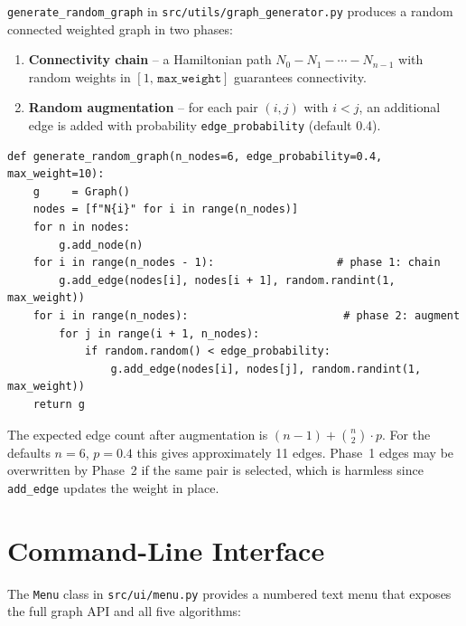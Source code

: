 \documentclass[12pt, a4paper]{article}
\begin{document}
\texttt{generate\_random\_graph} in \texttt{src/utils/graph\_generator.py}
produces a random connected weighted graph in two phases:

\begin{enumerate}
    \item \textbf{Connectivity chain} -- a Hamiltonian path
          $N_0 - N_1 - \cdots - N_{n-1}$ with random weights in
          $[1,\,\texttt{max\_weight}]$ guarantees connectivity.
    \item \textbf{Random augmentation} -- for each pair $(i,j)$ with
          $i < j$, an additional edge is added with probability
          \texttt{edge\_probability} (default 0.4).
\end{enumerate}

\begin{lstlisting}[caption={Random graph generator (\texttt{src/utils/graph\_generator.py}).}]
def generate_random_graph(n_nodes=6, edge_probability=0.4, max_weight=10):
    g     = Graph()
    nodes = [f"N{i}" for i in range(n_nodes)]
    for n in nodes:
        g.add_node(n)
    for i in range(n_nodes - 1):                   # phase 1: chain
        g.add_edge(nodes[i], nodes[i + 1], random.randint(1, max_weight))
    for i in range(n_nodes):                        # phase 2: augment
        for j in range(i + 1, n_nodes):
            if random.random() < edge_probability:
                g.add_edge(nodes[i], nodes[j], random.randint(1, max_weight))
    return g
\end{lstlisting}

The expected edge count after augmentation is
$(n-1) + \binom{n}{2}\cdot p$. For the defaults $n=6$, $p=0.4$ this
gives approximately 11 edges. Phase~1 edges may be overwritten by
Phase~2 if the same pair is selected, which is harmless since
\texttt{add\_edge} updates the weight in place.

\section{Command-Line Interface}
\label{sec:cli}

The \texttt{Menu} class in \texttt{src/ui/menu.py} provides a numbered
text menu that exposes the full graph API and all five algorithms:
\end{document}

